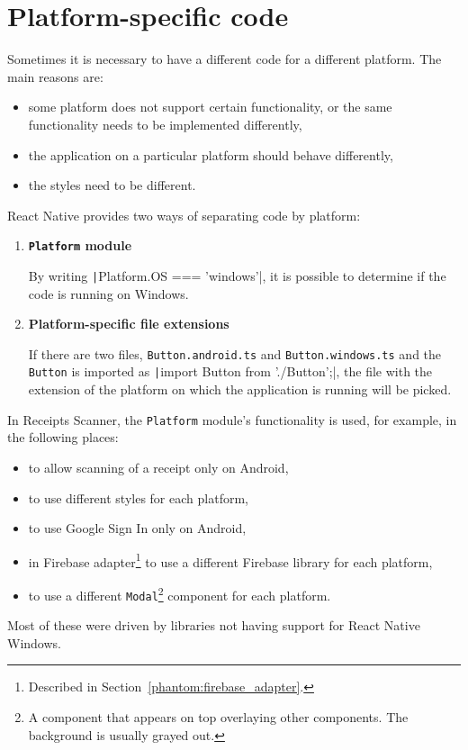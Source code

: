\documentclass[
  digital, %
  table,   %
  oneside, %
  lof,     %
  lot,     %
]{fithesis3}
\newcommand{\code}[1]{\texttt|#1|} %
\begin{document}
\section{Platform-specific code}
\label{sec:platform_specific_code}
Sometimes it is necessary to have a different code for a different platform. The main reasons are:
\begin{itemize}
\item some platform does not support certain functionality, or the same functionality needs to be implemented differently,
\item the application on a particular platform should behave differently,
\item the styles need to be different.
\end{itemize}

React Native provides two ways of separating code by platform:
\begin{enumerate}
\item \textbf{\texttt{Platform} module}
    
    By writing \code{Platform.OS === 'windows'}, it is possible to determine if the code is running on Windows.
\item \textbf{Platform-specific file extensions}

    If there are two files, \texttt{Button.android.ts} and \texttt{Button.windows.ts} and the \texttt{Button} is imported as \code{import Button from './Button';}‚ the file with the extension of the platform on which the application is running will be picked.
\end{enumerate}

In Receipts Scanner, the \texttt{Platform} module's functionality is used, for example, in the following places:
\begin{itemize}
    \item to allow scanning of a receipt only on Android,
    \item to use different styles for each platform,
    \item to use Google Sign In only on Android,
    \item in Firebase adapter\footnote{Described in Section~\ref{phantom:firebase_adapter}.} to use a different Firebase library for each platform,
    \item to use a different \texttt{Modal}\footnote{A component that appears on top overlaying other components. The background is usually grayed out.} component for each platform.
\end{itemize}
Most of these were driven by libraries not having support for React Native Windows.
\end{document}

